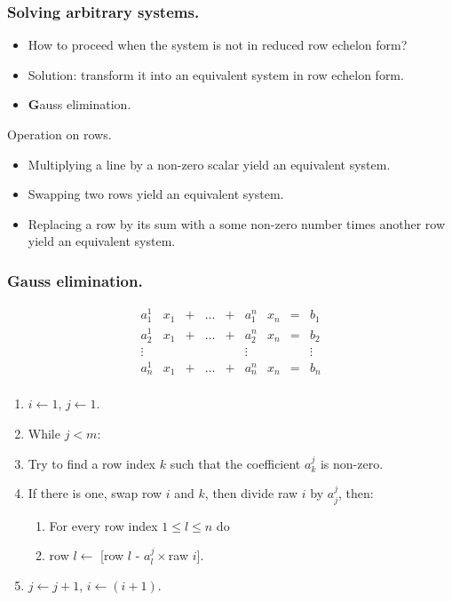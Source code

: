 \documentclass{beamer}
\begin{document}
\begin{frame}
  \frametitle{Solving arbitrary systems.}
  \begin{itemize}
  \item How to proceed when the system is not in reduced row echelon form?
  \item Solution: transform it into an equivalent system in row echelon form.
  \item {\textbf Gauss elimination.}
  \end{itemize}
\end{frame}

\begin{frame}{Operation on rows.}
  \begin{itemize}
  \item Multiplying a line by a non-zero scalar yield an equivalent system.
  \item Swapping two rows yield an equivalent system.
  \item Replacing a row by its sum with a some non-zero number times another row yield an equivalent system. 
  \end{itemize}
\end{frame}

\begin{frame}
  \frametitle{Gauss elimination.}
  \[
  \begin{array}{ccccccccc}
    a^1_1 & x_1 & + & \dots & + & a^n_1 & x_n & = & b_1 \\
    a^1_2 & x_1 & + & \dots & + & a^n_2 & x_n & = & b_2\\
    \vdots&     &   &      &  &\vdots&     &   & \vdots\\
    a^1_n & x_1 & + & \dots & + &  a^n_n & x_n & = & b_n\\
  \end{array}
  \]
  
  \begin{enumerate}
  \item $i \leftarrow 1$, $j \leftarrow 1$.
  \item While $j < m$:
  \item Try to find a row index $k$ such that the coefficient $a^j_k$ is non-zero.
  \item If there is one, swap row $i$ and $k$, then divide raw $i$ by $a^{j}_j$, then:
    \begin{enumerate}
    \item For every row index $1 \le l \le n$ do 
    \item row $l \leftarrow$ [row $l$ - $a^j_l\times$raw $i$].
    \end{enumerate}
  \item $j \leftarrow j+1$, $i \leftarrow (i+1)$.
  \end{enumerate}
  
\end{frame}
\end{document}
